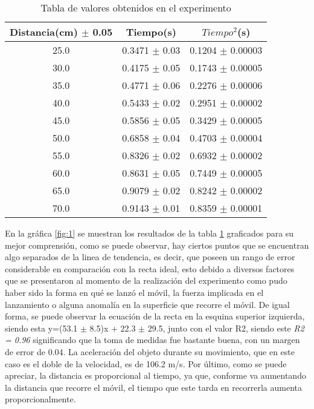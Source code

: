 \documentclass{article}
\begin{document}
\begin{table}[H]
	\centering
	\begin{tabular}{|c|c|c|}
		\hline
		Distancia(cm) $\pm$ 0.05 & Tiempo(s) & $Tiempo^2$(s) \\
		\hline
		25.0 & 0.3471 $\pm$ 0.03 & 0.1204 $\pm$ 0.00003 \\
		\hline
		30.0 & 0.4175 $\pm$ 0.05 & 0.1743 $\pm$ 0.00005 \\
		\hline
		35.0 & 0.4771 $\pm$ 0.06 & 0.2276 $\pm$ 0.00006 \\
		\hline
		40.0 & 0.5433 $\pm$ 0.02 & 0.2951 $\pm$ 0.00002 \\
		\hline
		45.0 & 0.5856 $\pm$ 0.05 & 0.3429 $\pm$ 0.00005 \\
		\hline
		50.0 & 0.6858 $\pm$ 0.04 & 0.4703 $\pm$ 0.00004 \\
		\hline
		55.0 & 0.8326 $\pm$ 0.02 & 0.6932 $\pm$ 0.00002 \\
		\hline
		60.0 & 0.8631 $\pm$ 0.05 & 0.7449 $\pm$ 0.00005 \\
		\hline
		65.0 & 0.9079 $\pm$ 0.02 & 0.8242 $\pm$ 0.00002 \\
		\hline
		70.0 & 0.9143 $\pm$ 0.01 & 0.8359 $\pm$ 0.00001 \\
		\hline
	\end{tabular}
	\caption{Tabla de valores obtenidos en el experimento}
	\label{table:1}
\end{table}

En la gráfica \ref{fig:1} se muestran los resultados de la tabla \ref{table:1} graficados para su mejor comprensión, como se puede observar, hay ciertos puntos que se encuentran algo separados de la linea de tendencia, es decir, que poseen un rango de error considerable en comparación con la recta ideal, esto debido a diversos factores que se presentaron al momento de la realización del experimento como pudo haber sido la forma en qué se lanzó el móvil, la fuerza implicada en el lanzamiento o alguna anomalía en la superficie que recorre el móvil. De igual forma, se puede observar la ecuación de la recta en la esquina superior izquierda, siendo esta y=(53.1 $\pm$ 8.5)x + 22.3 $\pm$ 29.5, junto con el valor R2, siendo este \emph{R2 = 0.96 }significando que la toma de medidas fue bastante buena, con un margen de error de 0.04. La aceleración del objeto durante su movimiento, que en este caso es el doble de la velocidad, es de 106.2 m/s. Por último, como se puede apreciar, la distancia es proporcional al tiempo, ya que, conforme va aumentando la distancia que recorre el móvil, el tiempo que este tarda en recorrerla aumenta proporcionalmente.
\end{document}
